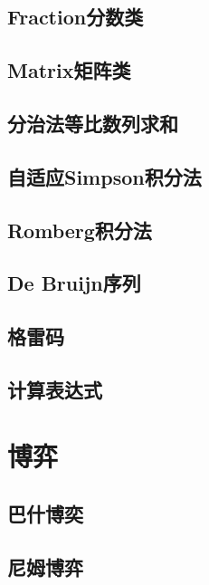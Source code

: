 \documentclass[a4paper, 12pt]{article}
\begin{document}
\subsection{Fraction分数类}

\subsection{Matrix矩阵类}

\subsection{分治法等比数列求和}

\subsection{自适应Simpson积分法}

\subsection{Romberg积分法}

\subsection{De Bruijn序列}

\subsection{格雷码}

\subsection{计算表达式}


\section{博弈}
\subsection{巴什博奕}

\subsection{尼姆博弈}

\end{document}
